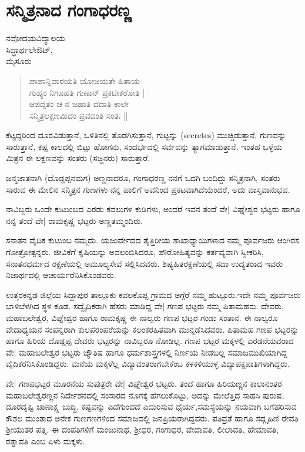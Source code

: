 \chapter{ಸನ್ಮಿತ್ರನಾದ ಗಂಗಾಧರಣ್ಣ}

\begin{center}
\smallskip

ನವೋದಯವಿದ್ಯಾಲಯ\\
ಸಿದ್ಧಾರ್ಥಲೇಔಟ್,\\ 
ಮೈಸೂರು
\end{center}

\begin{verse}
ಪಾಪಾನ್ನಿವಾರಯತಿ ಯೋಜಯತೇ ಹಿತಾಯ\\
ಗುಹ್ಯಂ ನಿಗೂಹತಿ ಗುಣಾನ್ ಪ್ರಕಟೀಕರೋತಿ |\\
ಆಪದ್ಗತಂ ಚ ನ ಜಹಾತಿ ದದಾತಿ ಕಾಲೇ\\
ಸನ್ಮಿತ್ರಲಕ್ಷಣಮಿದಂ ಪ್ರವದಂತಿ ಸಂತಃ ||
\end{verse}
ಕೆಟ್ಟದ್ದರಿಂದ ದೂರವಿಡುತ್ತಾನೆ, ಒಳಿತಿನಲ್ಲಿ ತೊಡಗಿಸುತ್ತಾನೆ, ಗುಟ್ಟನ್ನು (secretes) ಮುಚ್ಚಿಡುತ್ತಾನೆ, ಗುಣವನ್ನು ಸಾರುತ್ತಾನೆ, ಕಷ್ಟ ಕಾಲದಲ್ಲಿ ಬಿಟ್ಟು ಹೋಗನು, ಸಂದರ್ಭದಲ್ಲಿ ಸರ್ವವನ್ನು ತ್ಯಾಗಮಾಡುತ್ತಾನೆ. ಇಂತಹ ಒಳ್ಳೆಯ ಮಿತ್ರನ ಈ ಲಕ್ಷಣವನ್ನು ಸಂತರು (ಸಜ್ಜನರು) ಸಾರುತ್ತಾರೆ. 

ಜನ್ಮಜಾತನಾಗಿ (ದೊಡ್ಡಪ್ಪನಮಗ) ಅಣ್ಣನಾದರೂ, ಗಂಗಾಧರಣ್ಣ ನನಗೆ ಒದಗಿ ಬಂದಿದ್ದು ಸನ್ಮಿತ್ರನಾಗಿ, ಸಂತರು ಸಾರುವ ಈ ಮೇಲಿನ ಸನ್ಮಿತ್ರನ ಗುಣಗಳು ನನ್ನ ಪಾಲಿಗೆ ಅವನಿಂದ ಪ್ರಕಟವಾಗಿದೆಯೆಂದರೆ, ಅದು ವಾಸ್ತವಾನುಭವ.

ನಾವಿಬ್ಬರು ಒಂದೇ ಕುಟುಂಬದ ಎರಡು ಕವಲುಗಳ ಕುಡಿಗಳು, ಅಂದರೆ ಇವನ ತಂದೆ ವೇ| ವಿಘ್ನೇಶ್ವರ ಭಟ್ಟರು ಹಾಗೂ ನನ್ನ ತಂದೆ ವೇ| ರಾಮಕೃಷ್ಣ ಭಟ್ಟರು ಅಣ್ಣತಮ್ಮಂದಿರು.

ಸನಾತನ ವೈದಿಕ ಕುಟುಂಬ ನಮ್ಮದು. ಯಜುರ್ವೇದದ  ತೈತ್ತಿರೀಯ ಶಾಖಾಧ್ಯಾಯಿಗಳಾದ ನಮ್ಮ  ಪೂರ್ವಜರು ಆಂಗಿರಸ ಗೋತ್ರೋತ್ಪನ್ನರು. ಜೀವಿಕೆಗೆ ಕೃಷಿಯನ್ನು ಅವಲಂಬಿಸಿದರೂ, ಪೌರೋಹಿತ್ಯವನ್ನು ಕರ್ತವ್ಯವಾಗಿ ಸ್ವೀಕರಿಸಿ, ಸನಾತನಧರ್ಮದ ರಕ್ಷಣೆಯಲ್ಲಿ ಅಮೂಲ್ಯಸೇವೆ ಸಲ್ಲಿಸಿದವರು. ಶಿಷ್ಯಹಿತರಕ್ಷಣೆಯಲ್ಲಿ  ಸದಾ ಉದ್ಯತರಾದ ಇವರು ನಿಜಾರ್ಥದಲ್ಲಿ ಆಚಾರ್ಯರೆನಿಸಿಕೊಂಡವರು. 

ಉತ್ತರಕನ್ನಡ ಜಿಲ್ಲೆಯ ಸಿದ್ದಾಪುರ ತಾಲ್ಲೂಕು ಕವಲಕೊಪ್ಪ ಗ್ರಾಮದ ಅಗ್ಗೆರೆ ನಮ್ಮ ಹುಟ್ಟೂರು.ಇದೇ ನಮ್ಮ ಪೂರ್ವಜರು ಬಾಳಿಬೆಳಗಿದ ಸ್ಥಳ ಕೂಡ. ಸದ್ವೈದಿಕರಾಗಿ ಹೆಸರು ಮಾಡಿದ್ದ ವೇ| ಗಣಪ ಭಟ್ಟರು ನಮ್ಮ  ಪಿತಾಮಹರು. ದೇವರು, ಮಹಾಬಲೇಶ್ವರ, ವಿಘ್ನೇಶ್ವರ ಹಾಗೂ ರಾಮಕೃಷ್ಣ ಈ ನಾಲ್ವರು ಗಣಪ ಭಟ್ಟರ ಗಂಡು ಸಂತಾನ. ಈ ನಾಲ್ವರೂ ವೇದಾಧ್ಯಯನ ಸಂಪನ್ನರಾಗಿ ಕುಲಪರಂಪರೆಯನ್ನು ಕಲಂಕರಹಿತವಾಗಿ ಮುನ್ನಡೆಸಿದವರು. ಪಿತಾಮಹ ಗಣಪ ಭಟ್ಟರನ್ನು ಹಾಗೂ ಹಿರಿಯ ದೊಡ್ಡಪ್ಪ ದೇವರು ಭಟ್ಟರನ್ನು ನಾವಿಬ್ಬರೂ ನೋಡಿಲ್ಲ. ಗಣಪ ಭಟ್ಟರ ಮಕ್ಕಳಲ್ಲಿ ಎರಡನೆಯವರಾದ ವೇ| ಮಹಾಬಲೇಶ್ವರ ಭಟ್ಟರು ಜ್ಯೌತಿಷ ಹಾಗೂ ಧರ್ಮಶಾಸ್ತ್ರಗಳಲ್ಲಿ ನಿರ್ಣಯ ನೀಡಬಲ್ಲ ಸಮಾಜಮುಖಿಯಾಗಿದ್ದ ವೈದಿಕರೆನಿಸಿಕೊಂಡಿದ್ದರು. ಮನೆಯ ಮಕ್ಕಳೆಲ್ಲ ವಿದ್ಯಾವಂತರಾಗಬೇಕೆಂಬ ಕಳಕಳಿಯುಳ್ಳ ವಿದ್ಯಾಪಕ್ಷಪಾತಿಗಳಾಗಿದ್ದರು.

ವೇ| ಗಣಪಭಟ್ಟರ ಮೂರನೆಯ ಸುಪುತ್ರರೇ ವೇ| ವಿಘ್ನೇಶ್ವರ ಭಟ್ಟರು. ತಂದೆ ಹಾಗೂ ಹಿರಿಯಣ್ಣನ ಕಾಲಾನಂತರ ಮಹಾಬಲೇಶ್ವರಣ್ಣನ ನಿರ್ದೇಶನದಲ್ಲಿ ಸಂಸಾರದ ನೊಗಕ್ಕೆ ಹೆಗಲುಕೊಟ್ಟು, ಅದನ್ನು ಮೇಲೆತ್ತಿದ ಸಾಹಸಿ ಪುರುಷ. ದೂರದೃಷ್ಟಿ ಚಾಣಾಕ್ಷ್ಷ ಬುದ್ಧಿ, ಕಷ್ಟವನ್ನು ಎದೆಗುಂದದೆ ಎದುರಿಸುವ ಧೈರ್ಯ,ಸಮಸ್ಯೆಯನ್ನು ನಯವಾಗಿ ಬಗೆಹರಿಸುವ ಕೌಶಲ ಮುಂತಾದ ಅನೇಕ ಗುಣಗಣಗಳಿಂದ ಸಮಾಜದಲ್ಲಿ ಜನಪ್ರಿಯರಾಗಿದ್ದವರು. ಪತಿವ್ರತೆ ಹಾಗೂ ಸದ್ಗೃಹಿಣಿ ರೇವತಿ ಶ್ರೀಯುತರ ಪತ್ನಿ. ಈ ದಂಪತಿಗಳಿಗೆ ಮಂಜುನಾಥ, ಶ್ರೀಧರ, ಗಂಗಾಧರ, ವೇದಾವತಿ, ಲೀಲಾವತಿ, ಹೇಮಾವತಿ, ರತ್ನಾವತಿ ಎಂಬ ಏಳು ಮಕ್ಕಳು.

